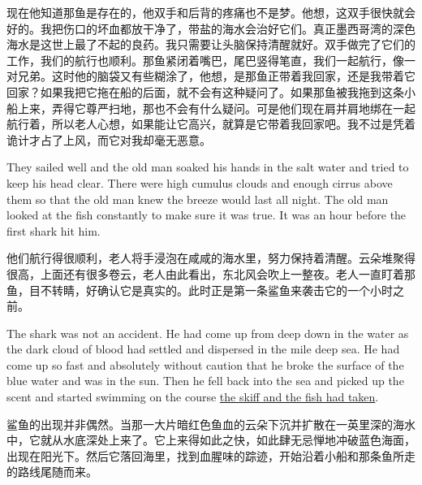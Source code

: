 \begin{paracol}{2}
\switchcolumn

现在他知道那鱼是存在的，他双手和后背的疼痛也不是梦。他想，这双手很快就会好的。我把伤口的坏血都放干净了，带盐的海水会治好它们。真正墨西哥湾的深色海水是这世上最了不起的良药。我只需要让头脑保持清醒就好。双手做完了它们的工作，我们的航行也顺利。那鱼紧闭着嘴巴，尾巴竖得笔直，我们一起航行，像一对兄弟。这时他的脑袋又有些糊涂了，他想，是那鱼正带着我回家，还是我带着它回家？如果我把它拖在船的后面，就不会有这种疑问了。如果那鱼被我拖到这条小船上来，弄得它尊严扫地，那也不会有什么疑问。可是他们现在肩并肩地绑在一起航行着，所以老人心想，如果能让它高兴，就算是它带着我回家吧。我不过是凭着诡计才占了上风，而它对我却毫无恶意。

\switchcolumn*

They sailed well and the old man \gls{soaked} his hands in the salt water
and tried to keep his head clear. There were high cumulus clouds and enough
cirrus above them so that the old man knew the breeze would last all night.
The old man looked at the fish \gls{constantly} to make sure it was true.
It was an hour before the first shark hit him.

\switchcolumn

他们航行得很顺利，老人将手浸泡在咸咸的海水里，努力保持着清醒。云朵堆聚得很高，上面还有很多卷云，老人由此看出，东北风会吹上一整夜。老人一直盯着那鱼，目不转睛，好确认它是真实的。此时正是第一条鲨鱼来袭击它的一个小时之前。

\switchcolumn*

The shark was not an \gls{accident}. He had come up from deep down in the
water as the dark cloud of blood had settled and \gls{dispersed} in the mile
deep sea. He had come up so fast and absolutely without \gls{caution} that
he broke the surface of the blue water and was in the sun. Then he fell back
into the sea and picked up the scent and started swimming on the course \uline{the
skiff and the fish had taken}.

\switchcolumn

鲨鱼的出现并非偶然。当那一大片暗红色鱼血的云朵下沉并扩散在一英里深的海水中，它就从水底深处上来了。它上来得如此之快，如此肆无忌惮地冲破蓝色海面，出现在阳光下。然后它落回海里，找到血腥味的踪迹，开始沿着小船和那条鱼所走的路线尾随而来。

\switchcolumn*


\end{paracol}
